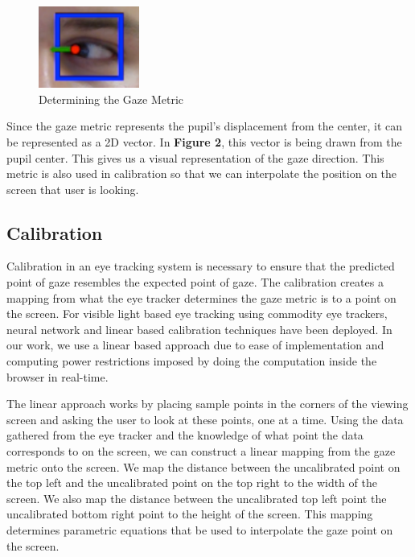 \documentclass[annual]{acmsiggraph}
\begin{document}
\begin{figure}[ht]

    \centering

    \includegraphics[width=1.3in]{figs/gazePrediction.pdf}

    \caption{Determining the Gaze Metric}

\end{figure}

 Since the gaze metric represents the pupil's displacement from the center, it
 can be represented as a 2D vector. In \textbf{Figure 2}, this vector is being
 drawn from the pupil center. This gives us a visual representation of the gaze
 direction. This metric is also used in calibration so that we can interpolate
 the position on the screen that user is looking.

\subsection{Calibration}

Calibration in an eye tracking system is necessary to ensure that the predicted
point of gaze resembles the expected point of gaze. The calibration creates a
mapping from what the eye tracker determines the gaze metric is to a point on
the screen. For visible light based eye tracking using commodity eye trackers,
neural network \cite{holland2012eye} and linear based calibration techniques
have been deployed. In our work, we use a linear based approach due to ease of
implementation and computing power restrictions imposed by doing the
computation inside the browser in real-time.

The linear approach works by placing sample points in the corners of the
viewing screen and asking the user to look at these points, one at a time.
Using the data gathered from the eye tracker and the knowledge of what point
the data corresponds to on the screen, we can construct a linear mapping from
the gaze metric onto the screen. We map the distance between the uncalibrated
point on the top left and  the uncalibrated point on the top right to the width
of the screen.  We also map the distance between the uncalibrated top left
point the uncalibrated bottom right point to the height of the screen. This
mapping determines parametric equations that be used to interpolate the gaze
point on the screen.
\end{document}
